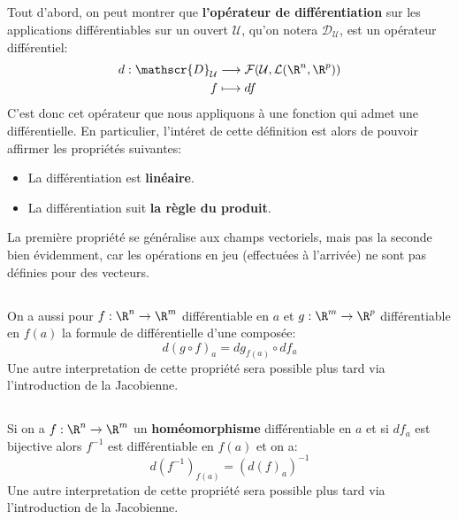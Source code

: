 \subsection*{}
Tout d'abord, on peut montrer que \textbf{l'opérateur de différentiation} sur les applications différentiables sur un ouvert \(\mathcal{U}\), qu'on notera \(\mathscr{D}_\mathcal{U}\), est un opérateur différentiel:
\[
   \begin{aligned}
      d : \mathscr{D}_\mathcal{U} &\longrightarrow \mathcal{F}(\mathcal{U}, \mathcal{L}(\R^n, \R^p))\\
      f &\longmapsto df
   \end{aligned}
\]
C'est donc cet opérateur que nous appliquons à une fonction qui admet une différentielle. En particulier, l'intéret de cette définition est alors de pouvoir affirmer les propriétés suivantes:
\begin{itemize}
   \item La différentiation est \textbf{linéaire}.
   \item La différentiation suit \textbf{la règle du produit}.
\end{itemize}
La première propriété se généralise aux champs vectoriels, mais pas la seconde bien évidemment, car les opérations en jeu (effectuées à l'arrivée) ne sont pas définies pour des vecteurs.

\subsection*{}
On a aussi pour \(f : \R^n \rightarrow \R^m\) différentiable en \(a\) et \(g : \R^m \rightarrow \R^p\) différentiable en \(f(a)\) la formule de différentielle d'une composée:
\[
   d(g \circ f)_a = dg_{f(a)} \circ df_a   
\]
Une autre interpretation de cette propriété sera possible plus tard via l'introduction de la Jacobienne.

\subsection*{}
Si on a \(f : \R^n \rightarrow \R^m\) un \textbf{homéomorphisme} différentiable en \(a\) et si \(df_a\) est bijective alors \(f^{-1}\) est différentiable en \(f(a)\) et on a:
\[
   d(f^{-1})_{f(a)} = (d(f)_a)^{-1}   
\]
Une autre interpretation de cette propriété sera possible plus tard via l'introduction de la Jacobienne.

